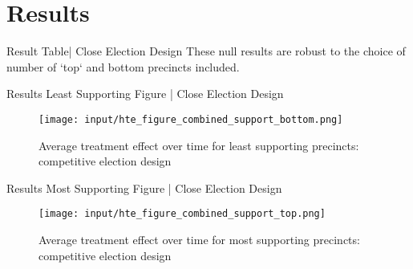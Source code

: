 \section{Results}

\begin{frame}{Result Table| Close Election Design}
These null results are robust to the choice of number of `top` and bottom precincts included.
    \begin{table}[ht]
        \centering
        \caption{Comparison of Average Treatment Effects: Competitive Election Designs}
        \label{tab:att_comparison_close_election}
    \end{table}
\end{frame}

\begin{frame}{Results Least Supporting Figure | Close Election Design}
    \begin{figure}[ht]
        \centering
        \texttt{[image: input/hte\_figure\_combined\_support\_bottom.png]}
        \caption{Average treatment effect over time for least supporting precincts: competitive election design}
        \label{fig:att_comparison_close_election_bottom}
    \end{figure}
\end{frame}

\begin{frame}{Results Most Supporting Figure | Close Election Design}
    \begin{figure}[ht]
        \centering
        \texttt{[image: input/hte\_figure\_combined\_support\_top.png]}
        \caption{Average treatment effect over time for most supporting precincts: competitive election design}
        \label{fig:att_comparison_close_election_bottom}
    \end{figure}
\end{frame}


